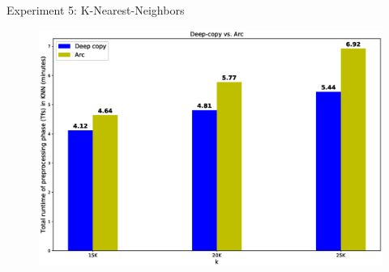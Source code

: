 \documentclass[9pt]{beamer}
\begin{document}
\begin{frame}[fragile]{Experiment 5: K-Nearest-Neighbors}
    \vspace{-0.7cm}
    \begin{figure}[hp]
        \centering
        \begin{center}
                \includegraphics[width=1.1\textwidth]{images/deepcopy_vs_arc.eps}
                \captionsetup{labelformat=empty}
        \end{center}
    \end{figure}
    
\end{frame}


    

\end{document}
